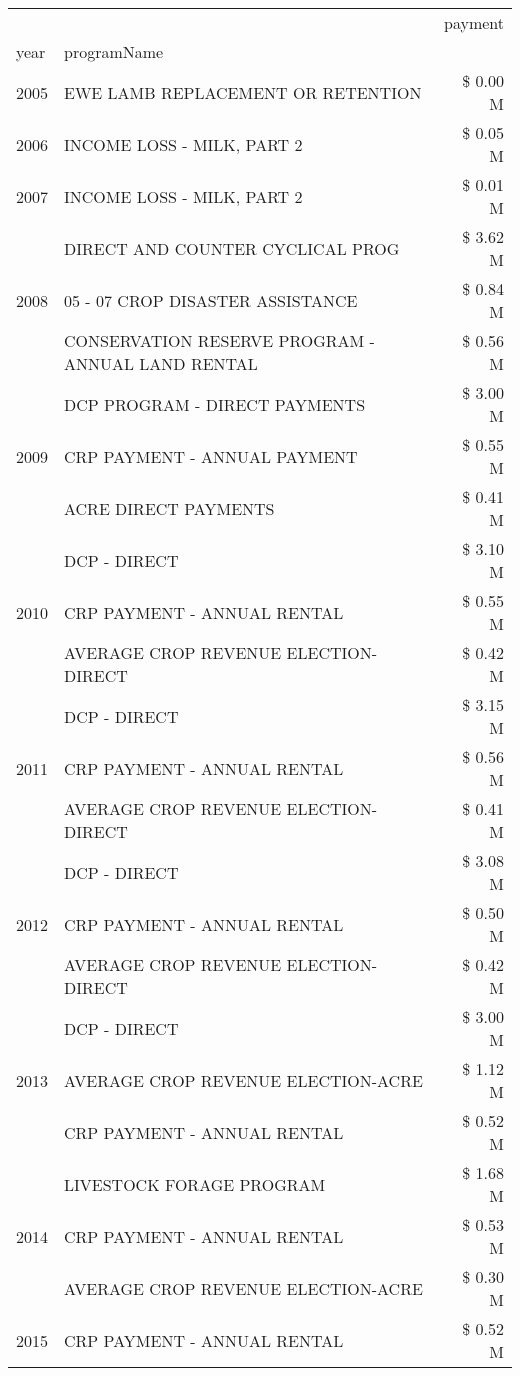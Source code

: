 \begin{tabular}{llr}
\toprule
 &  & payment \\
year & programName &  \\
\midrule
2005 & EWE LAMB REPLACEMENT OR RETENTION & \$ 0.00 M \\
\cline{1-3}
2006 & INCOME LOSS - MILK, PART 2 & \$ 0.05 M \\
\cline{1-3}
2007 & INCOME LOSS - MILK, PART 2 & \$ 0.01 M \\
\cline{1-3}
\multirow[t]{3}{*}{2008} & DIRECT AND COUNTER CYCLICAL PROG & \$ 3.62 M \\
 & 05 - 07 CROP DISASTER ASSISTANCE & \$ 0.84 M \\
 & CONSERVATION RESERVE PROGRAM - ANNUAL LAND RENTAL & \$ 0.56 M \\
\cline{1-3}
\multirow[t]{3}{*}{2009} & DCP PROGRAM - DIRECT PAYMENTS & \$ 3.00 M \\
 & CRP PAYMENT - ANNUAL PAYMENT & \$ 0.55 M \\
 & ACRE DIRECT PAYMENTS & \$ 0.41 M \\
\cline{1-3}
\multirow[t]{3}{*}{2010} & DCP - DIRECT & \$ 3.10 M \\
 & CRP PAYMENT - ANNUAL RENTAL & \$ 0.55 M \\
 & AVERAGE CROP REVENUE ELECTION-DIRECT & \$ 0.42 M \\
\cline{1-3}
\multirow[t]{3}{*}{2011} & DCP - DIRECT & \$ 3.15 M \\
 & CRP PAYMENT - ANNUAL RENTAL & \$ 0.56 M \\
 & AVERAGE CROP REVENUE ELECTION-DIRECT & \$ 0.41 M \\
\cline{1-3}
\multirow[t]{3}{*}{2012} & DCP - DIRECT & \$ 3.08 M \\
 & CRP PAYMENT - ANNUAL RENTAL & \$ 0.50 M \\
 & AVERAGE CROP REVENUE ELECTION-DIRECT & \$ 0.42 M \\
\cline{1-3}
\multirow[t]{3}{*}{2013} & DCP - DIRECT & \$ 3.00 M \\
 & AVERAGE CROP REVENUE ELECTION-ACRE & \$ 1.12 M \\
 & CRP PAYMENT - ANNUAL RENTAL & \$ 0.52 M \\
\cline{1-3}
\multirow[t]{3}{*}{2014} & LIVESTOCK FORAGE PROGRAM & \$ 1.68 M \\
 & CRP PAYMENT - ANNUAL RENTAL & \$ 0.53 M \\
 & AVERAGE CROP REVENUE ELECTION-ACRE & \$ 0.30 M \\
\cline{1-3}
\multirow[t]{3}{*}{2015} & CRP PAYMENT - ANNUAL RENTAL & \$ 0.52 M \\

\end{tabular}
